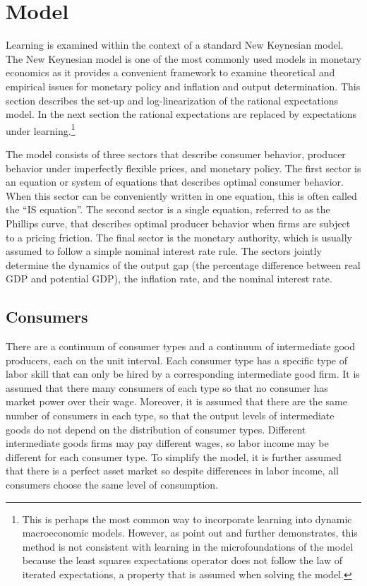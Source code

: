 \section{Model}
Learning is examined within the context of a standard New Keynesian model.  The New Keynesian model is one of the most commonly used models in monetary economics as it provides a convenient framework to examine theoretical and empirical issues for monetary policy and inflation and output determination.  This section describes the set-up and log-linearization of the rational expectations model. In the next section the rational expectations are replaced by expectations under learning.\footnote{This is perhaps the most common way to incorporate learning into dynamic macroeconomic models.  However, as  point out and  further demonstrates, this method is not consistent with learning in the microfoundations of the model because the least squares expectations operator does not follow the law of iterated expectations, a property that is assumed when solving the model.}

The model consists of three sectors that describe consumer behavior, producer behavior under imperfectly flexible prices, and monetary policy.  The first sector is an equation or system of equations that describes optimal consumer behavior.  When this sector can be conveniently written in one equation, this is often called the ``IS equation''.  The second sector is a single equation, referred to as the Phillips curve, that describes optimal producer behavior when firms are subject to a pricing friction.  The final sector is the monetary authority, which is usually assumed to follow a simple nominal interest rate rule.  The sectors jointly determine the dynamics of the output gap (the percentage difference between real GDP and potential GDP), the inflation rate, and the nominal interest rate.  

\subsection{Consumers}
There are a continuum of consumer types and a continuum of intermediate good producers, each on the unit interval.  Each consumer type has a specific type of labor skill that can only be hired by a corresponding intermediate good firm.  It is assumed that there many consumers of each type so that no consumer has market power over their wage.  Moreover, it is assumed that there are the same number of consumers in each type, so that the output levels of intermediate goods do not depend on the distribution of consumer types.  Different intermediate goods firms may pay different wages, so labor income may be different for each consumer type.  To simplify the model, it is further assumed that there is a perfect asset market so despite differences in labor income, all consumers choose the same level of consumption.

